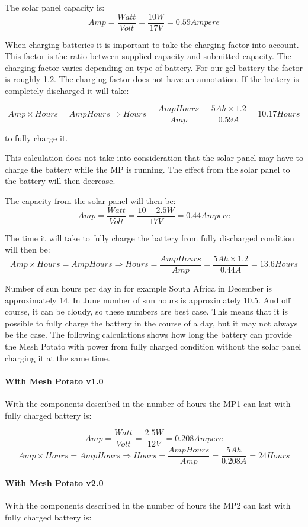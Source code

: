 The solar panel capacity is:
$$Amp = \frac{Watt}{Volt} = \frac{10 W}{17 V} = 0.59 Ampere$$

When charging batteries it is important to take the charging factor into account. This factor is the ratio between supplied capacity and submitted capacity. The charging factor varies depending on type of battery. For our gel battery the factor is roughly 1.2. The charging factor does not have an annotation. 
If the battery is completely discharged it will take: 

$$Amp\times Hours = AmpHours \Rightarrow Hours =\frac{AmpHours}{Amp} = \frac{5 Ah\times 1.2}{0.59 A} = 10.17 Hours$$

to fully charge it. 

This calculation does not take into consideration that the solar panel may have to charge the battery while the MP is running. The effect from the solar panel to the battery will then decrease. 

The capacity from the solar panel will then be: 
$$Amp = \frac{Watt}{Volt} = \frac{10-2.5 W}{17 V} = 0.44 Ampere$$

The time it will take to fully charge the battery from fully discharged condition will then be: 
$$Amp\times Hours = AmpHours \Rightarrow Hours =\frac{AmpHours}{Amp} = \frac{5 Ah\times 1.2}{0.44A} = 13.6 Hours$$

Number of sun hours per day in for example South Africa in December is approximately 14. In June number of sun hours is approximately 10.5. And off course, it can be cloudy, so these numbers are best case. This means that it is possible to fully charge the battery in the course of a day, but it may not always be the case. The following calculations shows how long the battery can provide the Mesh Potato with power from fully charged condition without the solar panel charging it at the same time. 

\paragraph{With Mesh Potato v1.0}
With the components described in  the number of hours the MP1 can last with fully charged battery is: 

$$Amp = \frac{Watt}{Volt} = \frac{2.5 W}{12 V} = 0.208 Ampere$$
$$Amp\times Hours = AmpHours \Rightarrow Hours = \frac{AmpHours}{Amp} = \frac{5 Ah}{0.208 A} = 24 Hours$$

\paragraph{With Mesh Potato v2.0}
With the components described in  the number of hours the MP2 can last with fully charged battery is: 

